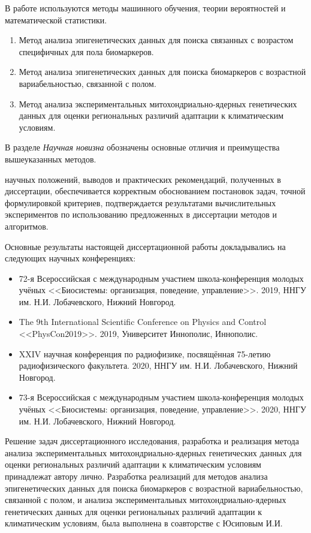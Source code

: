 {\methods} В работе используются методы машинного обучения, теории вероятностей и математической статистики.

{}
\begin{enumerate}[beginpenalty=10000]
	\item Метод анализа эпигенетических данных для поиска связанных с возрастом специфичных для пола биомаркеров.
	\item Метод анализа эпигенетических данных для поиска биомаркеров с возрастной вариабельностью, связанной с полом.
	\item Метод анализа экспериментальных митохондриально-ядерных генетических данных для оценки региональных различий адаптации к климатическим условиям.
\end{enumerate}

В разделе \textit{Научная новизна} обозначены основные отличия и преимущества вышеуказанных методов.

{\reliability} научных положений, выводов и практических рекомендаций, полученных в диссертации, обеспечивается корректным обоснованием постановок задач, точной формулировкой критериев,  подтверждается результатами вычислительных экспериментов по использованию предложенных в диссертации методов и алгоритмов.

{\probation} Основные результаты настоящей диссертационной работы докладывались на следующих научных конференциях:
\begin{itemize}[beginpenalty=10000]
	\item 72-я Всероссийская с международным участием школа-конференция молодых учёных <<Биосистемы: организация, поведение, управление>>. 2019, ННГУ им. Н.И. Лобачевского, Нижний Новгород.
	\item The 9th International Scientific Conference on Physics and Control <<PhysCon2019>>. 2019, Университет Иннополис, Иннополис.
	\item XXIV научная конференция по радиофизике, посвящённая 75-летию радиофизического факультета. 2020, ННГУ им. Н.И. Лобачевского, Нижний Новгород.
	\item 73-я Всероссийская с международным участием школа-конференция молодых учёных <<Биосистемы: организация, поведение, управление>>. 2020, ННГУ им. Н.И. Лобачевского, Нижний Новгород.
\end{itemize}

{\contribution} Решение задач диссертационного исследования, разработка и реализация метода анализа экспериментальных митохондриально-ядерных генетических данных для оценки региональных различий адаптации к климатическим условиям принадлежат автору лично. Разработка реализаций для методов анализа эпигенетических данных для поиска биомаркеров с возрастной вариабельностью, связанной с полом, и анализа экспериментальных митохондриально-ядерных генетических данных для оценки региональных различий адаптации к климатическим условиям, была выполнена в соавторстве с Юсиповым И.И.

